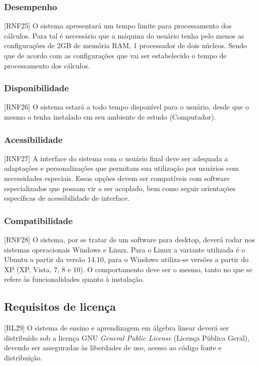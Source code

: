 \documentclass{scrreprt}
\begin{document}
\subsubsection{Desempenho}
[RNF25] O sistema apresentará um tempo limite para processamento dos cálculos. Para tal é necessário que a máquina do usuário tenha pelo menos as configurações de 2GB de memória RAM, 1 processador de dois núcleos. Sendo que de acordo com as configurações que vai ser estabelecido o tempo de processamento dos cálculos.

\subsubsection{Disponibilidade}
[RNF26] O sistema estará a todo tempo disponível para o usuário, desde que o mesmo o tenha instalado em seu ambiente de estudo (Computador).

\subsubsection{Acessibilidade}
[RNF27] A interface do sistema com o usuário final deve ser adequada a adaptações e personalizações que permitam sua utilização por usuários com necessidades especiais. Essas opções devem ser compatíveis com software especializados que possam vir a ser acoplado, bem como seguir orientações específicas de acessibilidade de interface.

\subsubsection{Compatibilidade}
[RNF28] O sistema, por se tratar de um software para desktop, deverá rodar nos sistemas operacionais Windows e Linux. Para o Linux a variante utilizada é o Ubuntu a partir da versão 14.10, para o Windows utiliza-se versões a partir do XP (XP, Vista, 7, 8 e 10). O comportamento deve ser o mesmo, tanto no que se refere às funcionalidades quanto à instalação.

\subsection{Requisitos de licença}
[RL29] O sistema de ensino e aprendizagem em álgebra linear deverá ser distribuído sob a licença GNU \textit{General Public License} (Licença Pública Geral), devendo ser asseguradas às liberdades de uso, acesso ao código fonte e distribuição.
\end{document}
